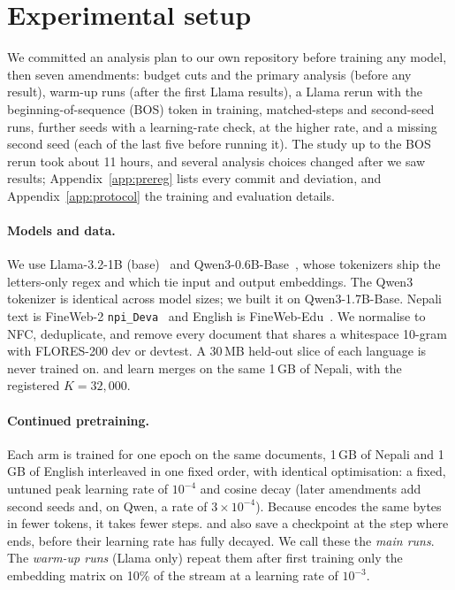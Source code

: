 \section{Experimental setup}
\label{sec:setup}

We committed an analysis plan to our own repository before training any model, then seven amendments: budget cuts and the primary analysis (before any result), warm-up runs (after the first Llama results), a Llama rerun with the beginning-of-sequence (BOS) token in training, matched-steps and second-seed runs, further seeds with a learning-rate check, \RO{} at the higher rate, and a missing second seed (each of the last five before running it). The study up to the BOS rerun took about 11 hours, and several analysis choices changed after we saw results; Appendix~\ref{app:prereg} lists every commit and deviation, and Appendix~\ref{app:protocol} the training and evaluation details.

\paragraph{Models and data.} We use Llama-3.2-1B (base)~\citep{grattafiori2024llama3} and Qwen3-0.6B-Base~\citep{yang2025qwen3}, whose tokenizers ship the letters-only regex and which tie input and output embeddings. The Qwen3 tokenizer is identical across model sizes; we built it on Qwen3-1.7B-Base. Nepali text is FineWeb-2 \texttt{npi\_Deva}~\citep{penedo2025fineweb2} and English is FineWeb-Edu~\citep{penedo2024fineweb}. We normalise to NFC, deduplicate, and remove every document that shares a whitespace 10-gram with FLORES-200 dev or devtest. A 30\,MB held-out slice of each language is never trained on. \RI{} and \RII{} learn merges on the same 1\,GB of Nepali, with the registered $K{=}32{,}000$.

\paragraph{Continued pretraining.} Each arm is trained for one epoch on the same documents, 1\,GB of Nepali and 1\,GB of English interleaved in one fixed order, with identical optimisation: a fixed, untuned peak learning rate of $10^{-4}$ and cosine decay (later amendments add second seeds and, on Qwen, a rate of $3{\times}10^{-4}$). Because \RII{} encodes the same bytes in fewer tokens, it takes fewer steps. \RO{} and \RI{} also save a checkpoint at the step where \RII{} ends, before their learning rate has fully decayed. We call these the \emph{main runs}. The \emph{warm-up runs} (Llama only) repeat them after first training only the embedding matrix on 10\% of the stream at a learning rate of $10^{-3}$.

